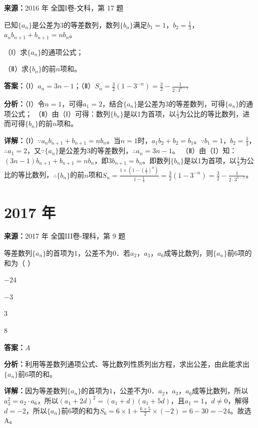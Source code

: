 \begin{question}[points=12]
\textbf{来源：}2016 年 全国I卷-文科，第 17 题\par
已知$\{a_n\}$是公差为3的等差数列，数列$\{b_n\}$满足$b_1=1$，$b_2=\frac{1}{3}$，$a_nb_{n+1}+b_{n+1}=nb_n$。

（Ⅰ）求$\{a_n\}$的通项公式；

（Ⅱ）求$\{b_n\}$的前$n$项和。
\begin{solution}
\textbf{答案：}（Ⅰ）$a_n=3n-1$；（Ⅱ）$S_n=\frac{3}{2}(1-3^{-n})=\frac{3}{2}-\frac{1}{2\cdot3^{n-1}}$

\textbf{分析：}（Ⅰ）令$n=1$，可得$a_1=2$，结合$\{a_n\}$是公差为3的等差数列，可得$\{a_n\}$的通项公式；
（Ⅱ）由（Ⅰ）可得：数列$\{b_n\}$是以1为首项，以$\frac{1}{3}$为公比的等比数列，进而可得$\{b_n\}$的前$n$项和。

\textbf{详解：}（Ⅰ）$\because a_nb_{n+1}+b_{n+1}=nb_n$。当$n=1$时，$a_1b_2+b_2=b_1$。$\because b_1=1$，$b_2=\frac{1}{3}$，$\therefore a_1=2$，又$\because \{a_n\}$是公差为3的等差数列，$\therefore a_n=3n-1$。
（Ⅱ）由（I）知：$(3n-1)b_{n+1}+b_{n+1}=nb_n$，即$3b_{n+1}=b_n$。即数列$\{b_n\}$是以1为首项，以$\frac{1}{3}$为公比的等比数列，$\therefore \{b_n\}$的前$n$项和$S_n=\frac{1\times(1-(\frac{1}{3})^n)}{1-\frac{1}{3}}=\frac{3}{2}(1-3^{-n})=\frac{3}{2}-\frac{1}{2\cdot3^{n-1}}$。
\end{solution}
\end{question}

\section*{2017 年}

\begin{question}[points=5]
\textbf{来源：}2017 年 全国III卷-理科，第 9 题\par
等差数列$\{a_n\}$的首项为$1$，公差不为$0$．若$a_2$，$a_3$，$a_6$成等比数列，则$\{a_n\}$前$6$项的和为（ ）
\begin{choices}
  \item $-24$
  \item $-3$
  \item $3$
  \item $8$
\end{choices}
\begin{solution}
\textbf{答案：}$A$

\textbf{分析：}利用等差数列通项公式、等比数列性质列出方程，求出公差，由此能求出$\{a_n\}$前6项的和。

\textbf{详解：}因为等差数列$\{a_n\}$的首项为$1$，公差不为$0$．$a_2$，$a_3$，$a_6$成等比数列，所以$a_3^2=a_2\cdot a_6$，所以$(a_1+2d)^2=(a_1+d)(a_1+5d)$，且$a_1=1$，$d\neq0$，解得$d=-2$，所以$\{a_n\}$前$6$项的和为$S_6=6\times1+\frac{6\times5}{2}\times(-2)=6-30=-24$。故选A。
\end{solution}
\end{question}

